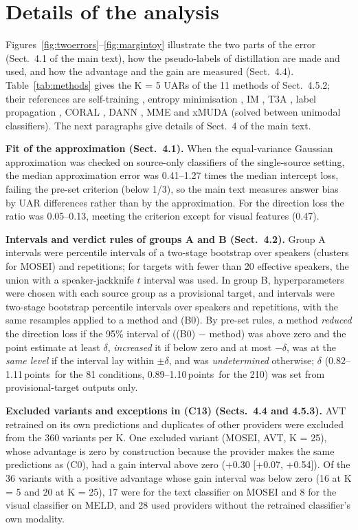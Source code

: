 \documentclass[sn-nature,pdflatex]{sn-jnl}
\newcommand{\pt}{\,points}
\begin{document}
\section{Details of the analysis}\label{sec:s2}
Figures~\ref{fig:twoerrors}--\ref{fig:margintoy} illustrate the two parts of the error (Sect.~4.1 of the main text), how the pseudo-labels of distillation are made and used, and how the advantage and the gain are measured (Sect.~4.4). Table~\ref{tab:methods} gives the K = 5 UARs of the 11 methods of Sect.~4.5.2; their references are self-training \cite{lee2013pseudolabel}, entropy minimisation \cite{grandvalet2004}, IM \cite{liang2020,boudiaf2020}, T3A \cite{iwasawa2021}, label propagation \cite{zhou2004,iscen2019}, CORAL \cite{sun2016coral}, DANN \cite{ganin2016dann}, MME \cite{saito2019mme} and xMUDA \cite{jaritz2020xmuda} (solved between unimodal classifiers). The next paragraphs give details of Sect.~4 of the main text.

\textbf{Fit of the approximation (Sect.~4.1).} When the equal-variance Gaussian approximation was checked on source-only classifiers of the single-source setting, the median approximation error was 0.41--1.27 times the median intercept loss, failing the pre-set criterion (below 1/3), so the main text measures answer bias by UAR differences rather than by the approximation. For the direction loss the ratio was 0.05--0.13, meeting the criterion except for visual features (0.47).

\textbf{Intervals and verdict rules of groups A and B (Sect.~4.2).} Group A intervals were percentile intervals of a two-stage bootstrap over speakers (clusters for MOSEI) and repetitions; for targets with fewer than 20 effective speakers, the union with a speaker-jackknife $t$ interval was used. In group B, hyperparameters were chosen with each source group as a provisional target, and intervals were two-stage bootstrap percentile intervals over speakers and repetitions, with the same resamples applied to a method and (B0). By pre-set rules, a method \emph{reduced} the direction loss if the 95\% interval of ((B0) $-$ method) was above zero and the point estimate at least $\delta$, \emph{increased} it if below zero and at most $-\delta$, was at the \emph{same level} if the interval lay within $\pm\delta$, and was \emph{undetermined} otherwise; $\delta$ (0.82--1.11\pt\ for the 81 conditions, 0.89--1.10\pt\ for the 210) was set from provisional-target outputs only.

\textbf{Excluded variants and exceptions in (C13) (Sects.~4.4 and 4.5.3).} AVT retrained on its own predictions and duplicates of other providers were excluded from the 360 variants per K. One excluded variant (MOSEI, AVT, K = 25), whose advantage is zero by construction because the provider makes the same predictions as (C0), had a gain interval above zero (+0.30 [+0.07, +0.54]). Of the 36 variants with a positive advantage whose gain interval was below zero (16 at K = 5 and 20 at K = 25), 17 were for the text classifier on MOSEI and 8 for the visual classifier on MELD, and 28 used providers without the retrained classifier's own modality.
\end{document}
